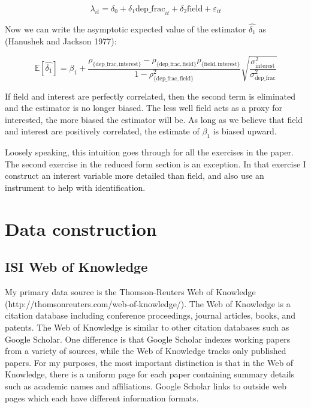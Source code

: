 \begin{equation}
    \lambda_{it} = \delta_0 + \delta_1 \mbox{dep\_frac}_{it} + \delta_2 \mbox{field} + \varepsilon_{it}
\end{equation}

Now we can write the asymptotic expected value of the estimator
$\hat{\delta_1}$ as (Hanushek and Jackson 1977):

\begin{equation}
    \mathbb{E}[\hat{\delta_1}] = \beta_1 + \frac{\rho_{\{\mbox{dep\_frac},\mbox{interest}\}} - \rho_{\{\mbox{dep\_frac},\mbox{field}\}}\rho_{\{\mbox{field},\mbox{interest}\}}}{1 - \rho_{\{\mbox{dep\_frac},\mbox{field}\}}^2} \sqrt{\frac{\sigma_{\mbox{interest}}^2}{\sigma_{\mbox{dep\_frac}}^2}}
\end{equation}

If field and interest are perfectly correlated, then the second term is
eliminated and the estimator is no longer biased. The less well field
acts as a proxy for interested, the more biased the estimator will be.
As long as we believe that field and interest are positively correlated,
the estimate of $\beta_1$ is biased upward.

Loosely speaking, this intuition goes through for all the exercises in
the paper. The second exercise in the reduced form section is an
exception. In that exercise I construct an interest variable more
detailed than field, and also use an instrument to help with
identification.

\section{Data construction}
\label{sec:dat_cons}

\subsection{ISI Web of Knowledge}

My primary data source is the Thomson-Reuters Web of Knowledge
(http://thomsonreuters.com/web-of-knowledge/). The Web of Knowledge is a
citation database including conference proceedings, journal articles,
books, and patents. The Web of Knowledge is similar to other citation
databases such as Google Scholar. One difference is that Google Scholar
indexes working papers from a variety of sources, while the Web of
Knowledge tracks only published papers. For my purposes, the most
important distinction is that in the Web of Knowledge, there is a
uniform page for each paper containing summary details such as academic
names and affiliations. Google Scholar links to outside web pages which
each have different information formats.

